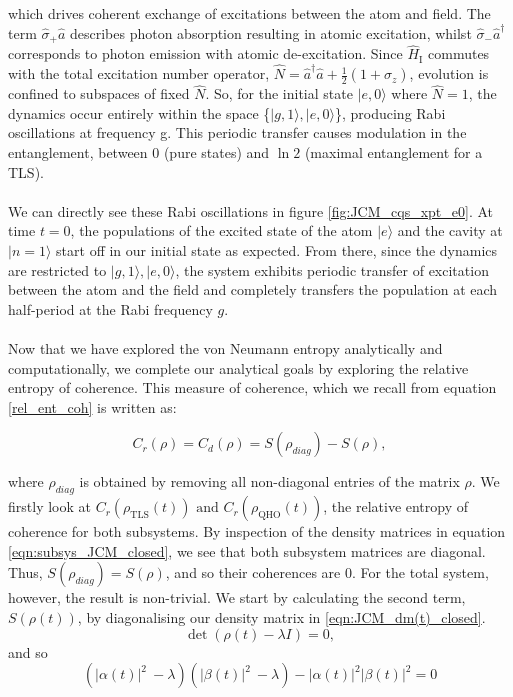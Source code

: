 \documentclass[11pt]{article}
\begin{document}
which drives coherent exchange of excitations between the atom and field. The term $\hat{\sigma}_{+}\hat{a}$ describes photon absorption resulting in atomic excitation, whilst $\hat{\sigma}_{-}\hat{a}^\dagger$ corresponds to photon emission with atomic de-excitation. Since $\hat{H}_{\scriptscriptstyle\text{I}}$ commutes with the total excitation number operator, $\hat{N} = \hat{a}^\dagger \hat{a} + \frac{1}{2}(1 + \hat{\sigma}_z)$, evolution is confined to subspaces of fixed $\hat{N}$. So, for the initial state $|e,0\rangle$ where $\hat{N} = 1$, the dynamics occur entirely within the space \small{\{$|g,1\rangle,|e,0\rangle$\}}, producing Rabi oscillations at frequency g. This periodic transfer causes modulation in the entanglement, between  0 (pure states) and $\ln2$ (maximal entanglement for a TLS).\\
\\
We can directly see these Rabi oscillations in figure \ref{fig:JCM_cqs_xpt_e0}. At time $t = 0$, the populations of the excited state of the atom $|e\rangle$ and the cavity at  $|n=1\rangle$ start off in our initial state as expected. From there, since the dynamics are restricted to \small{{$|g,1\rangle,|e,0\rangle$}}, the system exhibits periodic transfer of excitation between the atom and the field and completely transfers the population at each half-period at the Rabi frequency $g$.\\
\\
Now that we have explored the von Neumann entropy analytically and computationally, we complete our analytical goals by exploring the relative entropy of coherence. This measure of coherence, which we recall from equation \eqref{rel_ent_coh} is written as:


\begin{equation*}
C_r(\rho) = C_d(\rho) = S(\rho_{diag}) - S(\rho),
\end{equation*}

where $\rho_{diag}$ is obtained by removing all non-diagonal entries of the matrix $\rho$. We firstly look at $C_r(\rho_{\scriptscriptstyle \text{TLS}}(t)) \text{ and }  C_r(\rho_{\scriptscriptstyle \text{QHO}}(t))$, the relative entropy of coherence for both subsystems. By inspection of the density matrices in equation \eqref{eqn:subsys_JCM_closed}, we see that both subsystem matrices are diagonal. Thus, $S(\rho_{diag}) = S(\rho)$, and so their coherences are $0$. For the total system, however, the result is non-trivial. We start by calculating the second term, $S(\rho(t))$, by diagonalising our density matrix in \eqref{eqn:JCM_dm(t)_closed}.
\begin{equation*}
    \det(\rho(t) - \lambda I) = 0,
\end{equation*}
and so 
\begin{equation*}
    \left(|\alpha(t)|^2\ - \lambda\right) \left(|\beta(t)|^2\ - \lambda \right) - |\alpha(t)|^2|\beta(t)|^2 =0
\end{equation*}
\end{document}
